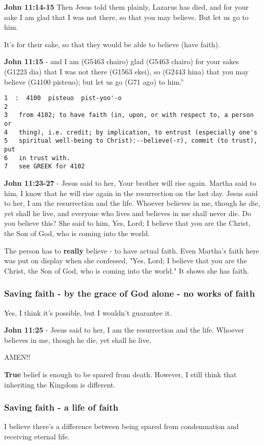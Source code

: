 \documentclass[11pt]{article}
\begin{document}
\textbf{John 11:14-15} Then Jesus told them plainly, Lazarus has died, and for your sake I am glad that I was not there, so that you may believe. But let us go to him.

It's for their sake, so that they would be able to believe (have faith).

\textbf{John 11:15} - and I am (G5463 chairo) glad (G5463 chairo) for your sakes (G1223 dia) that I was not there (G1563 ekei), so (G2443 hina) that you may believe (G4100 pisteuo); but let us go (G71 ago) to him.”

\begin{verbatim}
1  :  4100  pisteuo  pist-yoo'-o
2  
3   from 4102; to have faith (in, upon, or with respect to, a person or
4   thing), i.e. credit; by implication, to entrust (especially one's
5   spiritual well-being to Christ):--believe(-r), commit (to trust), put
6   in trust with.
7   see GREEK for 4102
\end{verbatim}

\textbf{John 11:23-27} - Jesus said to her, Your brother will rise again.  Martha said to him, I know that he will rise again in the resurrection on the last day.  Jesus said to her, I am the resurrection and the life. Whoever believes in me, though he die, yet shall he live, and everyone who lives and believes in me shall never die. Do you believe this?  She said to him, Yes, Lord; I believe that you are the Christ, the Son of God, who is coming into the world.

The person has to \textbf{really} believe - to have actual faith.
Even Martha's faith here was put on display when she confessed,
"Yes, Lord; I believe that you are the Christ, the Son of God, who is coming into the world."
It shows she has faith.

\subsubsection{Saving faith - by the grace of God alone - no works of faith}
\label{sec:org8089714}
Yes, I think it's possible, but I wouldn't guarantee it.

\textbf{John 11:25} - Jesus said to her, I am the resurrection and the life. Whoever believes in me, though he die, yet shall he live,

AMEN!!

\textbf{True} belief is enough to be spared from death.
However, I still think that inheriting the Kingdom is different.

\subsubsection{Saving faith - a life of faith}
\label{sec:orgd58cf54}
I believe there's a difference between being spared from condemnation and receiving eternal life.
\end{document}
